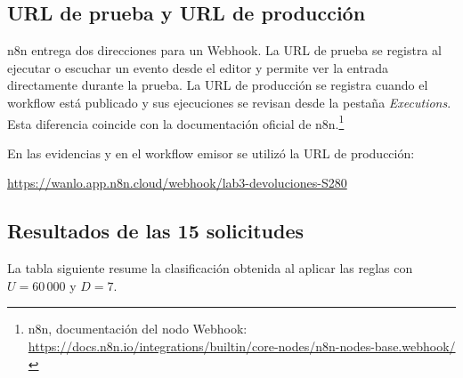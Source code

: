 \documentclass[11pt,a4paper]{article}
\begin{document}
\subsection*{URL de prueba y URL de producción}

n8n entrega dos direcciones para un Webhook. La URL de prueba se registra al ejecutar o escuchar un evento desde el editor y permite ver la entrada directamente durante la prueba. La URL de producción se registra cuando el workflow está publicado y sus ejecuciones se revisan desde la pestaña \emph{Executions}. Esta diferencia coincide con la documentación oficial de n8n.\footnote{n8n, documentación del nodo Webhook: \url{https://docs.n8n.io/integrations/builtin/core-nodes/n8n-nodes-base.webhook/}}

En las evidencias y en el workflow emisor se utilizó la URL de producción:
\begin{center}
\small\url{https://wanlo.app.n8n.cloud/webhook/lab3-devoluciones-S280}
\end{center}

\subsection*{Resultados de las 15 solicitudes}

La tabla siguiente resume la clasificación obtenida al aplicar las reglas con $U=60\,000$ y $D=7$.
\end{document}
